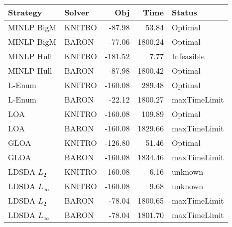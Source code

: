 \begin{tabular}{llrrl}
\toprule
Strategy & Solver & Obj & Time & Status \\
\midrule
MINLP BigM & KNITRO & -87.98 & 53.84 & Optimal \\
MINLP BigM & BARON & -77.06 & 1800.24 & Optimal \\
MINLP Hull & KNITRO & -181.52 & 7.77 & Infeasible \\
MINLP Hull & BARON & -87.98 & 1800.42 & Optimal \\
L-Enum & KNITRO & -160.08 & 289.48 & Optimal \\
L-Enum & BARON & -22.12 & 1800.27 & maxTimeLimit \\
LOA & KNITRO & -160.08 & 109.89 & Optimal \\
LOA & BARON & -160.08 & 1829.66 & maxTimeLimit \\
GLOA & KNITRO & -126.80 & 51.46 & Optimal \\
GLOA & BARON & -160.08 & 1834.46 & maxTimeLimit \\
LDSDA $L_2$ & KNITRO & -160.08 & 6.16 & unknown \\
LDSDA $L_\infty$ & KNITRO & -160.08 & 9.68 & unknown \\
LDSDA $L_2$ & BARON & -78.04 & 1800.65 & maxTimeLimit \\
LDSDA $L_\infty$ & BARON & -78.04 & 1801.70 & maxTimeLimit \\
\bottomrule
\end{tabular}
